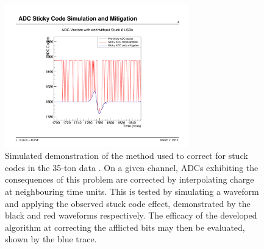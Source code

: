 \begin{figure}
  \centering
  \includegraphics[width=8cm]{stuckbitsremoval.pdf}
  \caption[Simulated demonstration of the method used to correct for stuck codes in the 35-ton data.]{Simulated demonstration of the method used to correct for stuck codes in the 35-ton data \cite{Insler2016}.  On a given channel, ADCs exhibiting the consequences of this problem are corrected by interpolating charge at neighbouring time units.  This is tested by simulating a waveform and applying the observed stuck code effect, demonstrated by the black and red waveforms respectively.  The efficacy of the developed algorithm at correcting the afflicted bits may then be evaluated, shown by the blue trace.}
  \label{fig:StuckBitInterpolation}
\end{figure}

